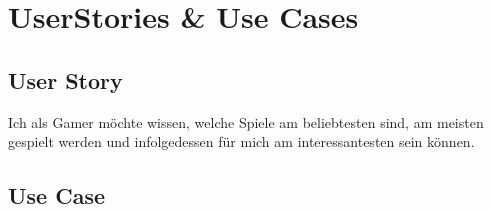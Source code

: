 \section{UserStories \& Use Cases}

\subsection{User Story}

Ich als Gamer möchte wissen, welche Spiele am beliebtesten sind, am meisten gespielt werden und infolgedessen für mich am interessantesten sein können.

\subsection{Use Case}
